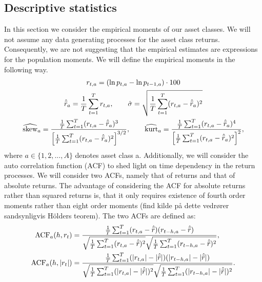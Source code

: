 \documentclass[11pt,a4paper,oneside]{article}
\newcommand{\rb}{\right]}
\newcommand{\lb}{\left[}
\begin{document}
\subsection{Descriptive statistics}\label{descriptivesection}
\noindent In this section we consider the empirical moments of our asset classes. We will not assume any data generating processes for the asset class returns. Consequently, we are not suggesting that the empirical estimates are expressions for the population moments. We will define the empirical moments in the following way.
\vspace{-7mm}
\begin{gather}
    r_{t,a}=(\ln{p_{t,a}}-\ln{p_{t-1,a}})\cdot 100
    \\
    \hat{\Bar{r}}_a=\frac{1}{T}\sum_{t=1}^{T}r_{t,a}, \qquad \hat{\sigma}= \sqrt{\frac{1}{T}\sum_{t=1}^{T}(r_{t,a}-\hat{\Bar{r}}_a)^2} \label{meanvol} \\ 
    \widehat{\text{skew}}_a=\frac{\frac{1}{T}\sum_{t=1}^{T}(r_{t,a}-\hat{\Bar{r}}_a)^3}{\lb\frac{1}{T}\sum_{t=1}^{T}(r_{t,a}-\hat{\Bar{r}}_a)^2\rb^{3/2}}
    , \qquad \widehat{\text{kurt}}_a=\frac{\frac{1}{T}\sum_{t=1}^{T}(r_{t,a}-\hat{\Bar{r}}_a)^4}{\lb\frac{1}{T}\sum_{t=1}^{T}(r_{t,a}-\hat{\Bar{r}}_a)^2\rb^{2}} \label{skewkurt},
\end{gather}
where $a \in \{1,2,...,A\}$ denotes asset class a. Additionally, we will consider the auto correlation function (ACF) to shed light on time dependency in the return processes. We will consider two ACFs, namely that of returns and that of absolute returns. The advantage of considering the ACF for absolute returns rather than squared returns is, that it only requires existence of fourth order moments rather than eight order moments (find kilde på dette vedrører sandsynligvis Hölders teorem). The two ACFs are defined as:
\begin{align}
    \text{ACF}_a(h,r_t)&= \frac{\frac{1}{T}\sum_{t=1}^{T}(r_{t,a}-\hat{\Bar{r}})(r_{t-h,a}-\hat{\Bar{r}})}{\sqrt{\frac{1}{T}\sum_{t=1}^{T}(r_{t,a}-\hat{\Bar{r}})^2}\sqrt{\frac{1}{T}\sum_{t=1}^{T}(r_{t-h,a}-\hat{\Bar{r}})^2}} \label{acf} ,  \\
    \text{ACF}_a(h,\vert {r_t} \vert) &= \frac{\frac{1}{T}\sum_{t=1}^{T}(\vert r_{t,a} \vert-\vert\hat{\Bar{r}}\vert)(\vert r_{t-h,a}\vert-\vert\hat{\Bar{r}}\vert)}{\sqrt{\frac{1}{T}\sum_{t=1}^{T}(\vert r_{t,a}\vert-\vert\hat{\Bar{r}}\vert)^2}\sqrt{\frac{1}{T}\sum_{t=1}^{T}(\vert r_{t-h,a}\vert-\vert\hat{\Bar{r}}\vert)^2}} \label{acfabs}. 
\end{align}
\end{document}
